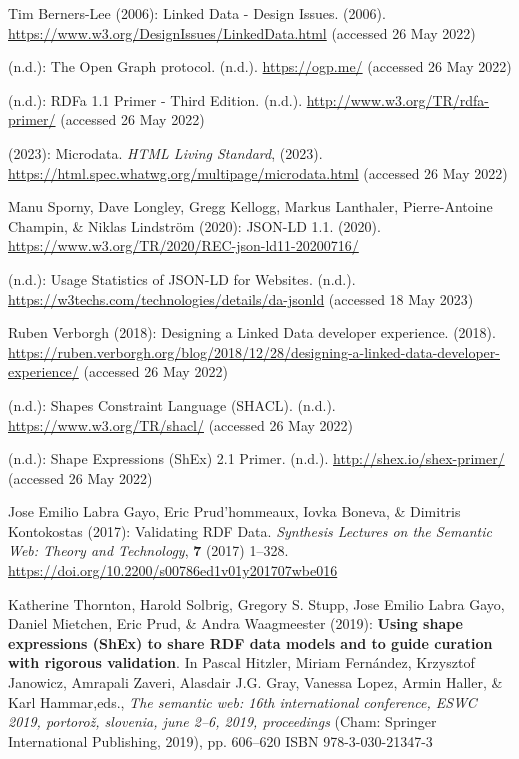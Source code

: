\begin{thebibliography}{9}
Tim Berners-Lee (2006): Linked {Data} - {Design Issues}. (2006).
\url{https://www.w3.org/DesignIssues/LinkedData.html} (accessed 26 May
2022)

(n.d.): The {Open Graph} protocol. (n.d.). \url{https://ogp.me/}
(accessed 26 May 2022)

(n.d.): {RDFa} 1.1 {Primer} - {Third Edition}. (n.d.).
\url{http://www.w3.org/TR/rdfa-primer/} (accessed 26 May 2022)

(2023): {Microdata}. \emph{{HTML Living Standard}}, (2023).
\url{https://html.spec.whatwg.org/multipage/microdata.html} (accessed 26
May 2022)

Manu Sporny, Dave Longley, Gregg Kellogg, Markus Lanthaler,
Pierre-Antoine Champin, \& Niklas Lindström (2020): {JSON-LD} 1.1.
(2020). \url{https://www.w3.org/TR/2020/REC-json-ld11-20200716/}

(n.d.): {Usage Statistics of JSON-LD for Websites}. (n.d.).
\url{https://w3techs.com/technologies/details/da-jsonld} (accessed 18
May 2023)

Ruben Verborgh (2018): Designing a {Linked Data} developer experience.
(2018).
\url{https://ruben.verborgh.org/blog/2018/12/28/designing-a-linked-data-developer-experience/}
(accessed 26 May 2022)

(n.d.): Shapes {Constraint Language} ({SHACL}). (n.d.).
\url{https://www.w3.org/TR/shacl/} (accessed 26 May 2022)

(n.d.): Shape {Expressions} ({ShEx}) 2.1 {Primer}. (n.d.).
\url{http://shex.io/shex-primer/} (accessed 26 May 2022)

Jose Emilio Labra Gayo, Eric Prud'hommeaux, Iovka Boneva, \& Dimitris
Kontokostas (2017): Validating {RDF Data}. \emph{Synthesis Lectures on
the Semantic Web: Theory and Technology}, \textbf{7} (2017) 1--328.
\url{https://doi.org/10.2200/s00786ed1v01y201707wbe016}

Katherine Thornton, Harold Solbrig, Gregory S. Stupp, Jose Emilio Labra
Gayo, Daniel Mietchen, Eric Prud, \& Andra Waagmeester (2019):
\textbf{Using shape expressions ({ShEx}) to share {RDF} data models and
to guide curation with rigorous validation}. In Pascal Hitzler, Miriam
Fernández, Krzysztof Janowicz, Amrapali Zaveri, Alasdair J.G. Gray,
Vanessa Lopez, Armin Haller, \& Karl Hammar,eds., \emph{The semantic
web: 16th international conference, {ESWC} 2019, portorož, slovenia,
june 2--6, 2019, proceedings} ({Cham}: {Springer International
Publishing}, 2019), pp. 606--620 ISBN 978-3-030-21347-3


\end{thebibliography}
